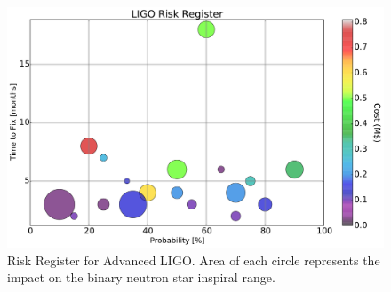 \begin{figure}[h]
\centering
\includegraphics[width=\columnwidth]{Figures/Risk.pdf}
\caption{Risk Register for Advanced LIGO. Area of each circle represents the impact on the binary neutron star inspiral range.}
\label{fig:RiskBubbles}
\end{figure}

